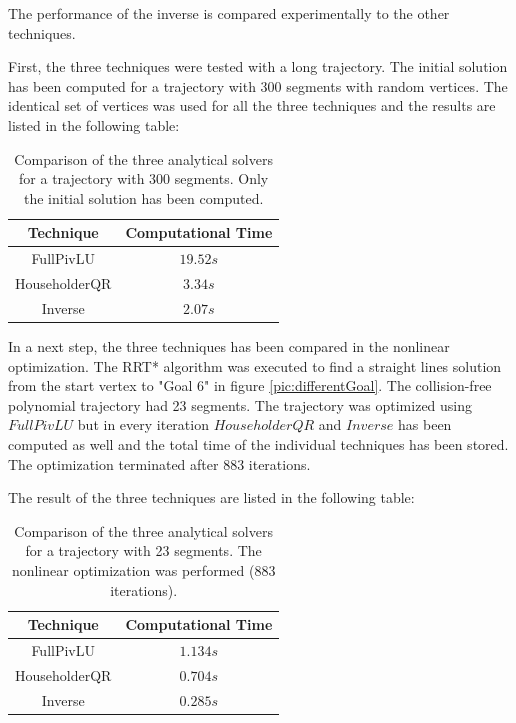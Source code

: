 The performance of the inverse is compared experimentally to the other techniques. \newline

First, the three techniques were tested with a long trajectory. The initial solution has been computed for a trajectory with 300 segments with random vertices. The identical set of vertices was used for all the three techniques and the results are listed in the following table:

\begin{table}[H] 
\begin{center}
    \begin{tabular}{| c | c | }
    \hline
    Technique & Computational Time  \\ \hline
  FullPivLU  & $19.52s$\\ \hline
  HouseholderQR & $3.34s$\\ \hline
 Inverse & $2.07s$\\
    \hline
    \end{tabular}
    \caption{Comparison of the three analytical solvers for a trajectory with 300 segments. Only the initial solution has been computed.}
    \label{tab:300seg}
\end{center}
\end{table}

In a next step, the three techniques has been compared in the nonlinear optimization. The RRT* algorithm was executed to find a straight lines solution from the start vertex to "Goal 6" in figure \ref{pic:differentGoal}. The collision-free polynomial trajectory had 23 segments. The trajectory was optimized using $FullPivLU$ but in every iteration $HouseholderQR$ and $Inverse$ has been computed as well and the total time of the individual techniques has been stored. The optimization terminated after 883 iterations. \newpage

The result of the three techniques are listed in the following table:

\begin{table}[H] 
\begin{center}
    \begin{tabular}{| c | c | }
    \hline
    Technique & Computational Time  \\ \hline
  FullPivLU  & $1.134s$\\ \hline
  HouseholderQR & $0.704s$\\ \hline
 Inverse & $0.285s$\\
    \hline
    \end{tabular}
    \caption{Comparison of the three analytical solvers for a trajectory with 23 segments. The nonlinear optimization was performed (883 iterations).}
    \label{tab:883iter}
\end{center}
\end{table}

